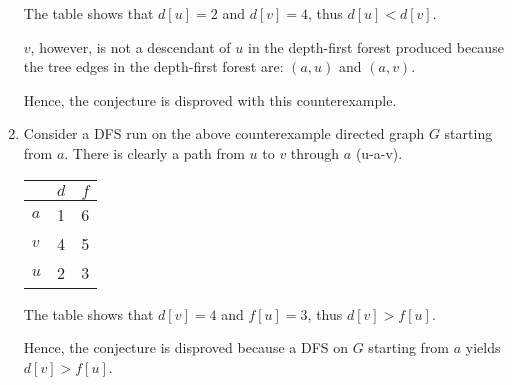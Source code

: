 \documentclass[a4paper]{report}
\begin{document}
\begin{enumerate}
      The table shows that $d[u]=2$ and $d[v]=4$, thus $d[u] < d[v]$.

      $v$, however, is not a descendant of $u$ in the depth-first forest produced because the tree edges 
      in the depth-first forest are: $(a,u)$ and $(a,v)$. 

      Hence, the conjecture is disproved with this counterexample.

    \par
    \bigskip

    \item

      Consider a DFS run on the above counterexample directed graph $G$ starting from $a$.  
      There is clearly a path from $u$ to $v$ through $a$ (u-a-v).

      \begin{center}
        \begin{tabular}{ l | c | r }
          \hline
            & $d$ & $f$ \\ \hline
          $a$ & 1 & 6 \\
          $v$ & 4 & 5 \\
          $u$ & 2 & 3 \\
          \hline  
        \end{tabular}
      \end{center}

      The table shows that $d[v]=4$ and $f[u]=3$, thus $d[v] > f[u]$.

      Hence, the conjecture is disproved because a DFS on $G$ starting from $a$ yields $d[v] > f[u]$.


    \par
    \bigskip


\end{enumerate}
\end{document}

